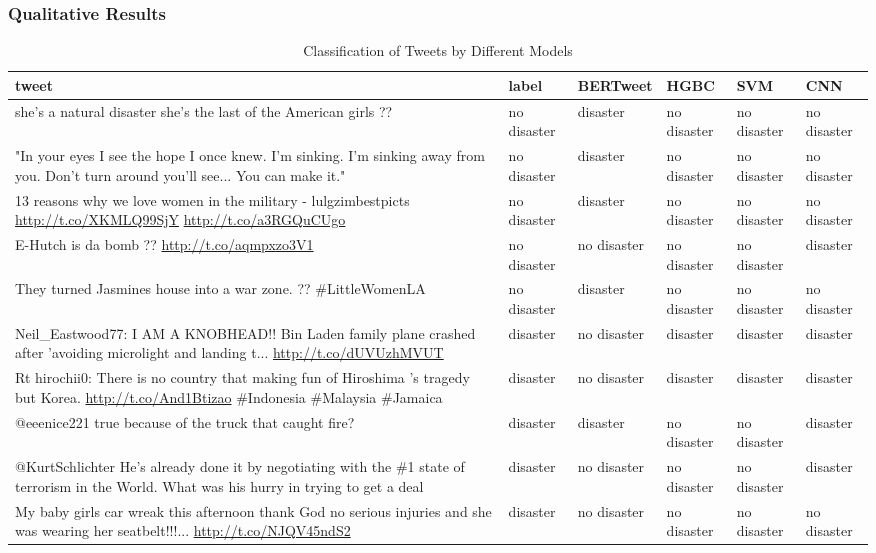 \documentclass[10pt,table]{article}
\begin{document}
\subsubsection{Qualitative Results}
\begin{table}[h]
    \centering
    \begin{tabular}{|p{6cm}|l|l|l|l|l|}
    \hline
    \textbf{tweet} & \textbf{label} & \textbf{BERTweet} & \textbf{HGBC} & \textbf{SVM} & \textbf{CNN} \\ \hline
    she's a natural disaster she's the last of the American girls ?? & no disaster & disaster & no disaster & no disaster & no disaster \\ \hline
    "In your eyes I see the hope I once knew. I'm sinking. I'm sinking away from you. Don't turn around you'll see... You can make it." & no disaster & disaster & no disaster & no disaster & no disaster \\ \hline
    13 reasons why we love women in the military - lulgzimbestpicts \url{http://t.co/XKMLQ99SjY} \url{http://t.co/a3RGQuCUgo} & no disaster & disaster & no disaster & no disaster & no disaster \\ \hline
    E-Hutch is da bomb ?? \url{http://t.co/aqmpxzo3V1} & no disaster & no disaster & no disaster & no disaster & disaster \\ \hline
    They turned Jasmines house into a war zone. ?? \#LittleWomenLA & no disaster & disaster & no disaster & no disaster & no disaster \\ \hline
    Neil\_Eastwood77: I AM A KNOBHEAD!! Bin Laden family plane crashed after 'avoiding microlight and landing t... \url{http://t.co/dUVUzhMVUT} & disaster & no disaster & disaster & disaster & disaster \\ \hline
    Rt hirochii0: There is no country that making fun of Hiroshima 's tragedy but Korea. \url{http://t.co/And1Btizao} \#Indonesia \#Malaysia \#Jamaica & disaster & no disaster & disaster & disaster & disaster \\ \hline
    @eeenice221 true because of the truck that caught fire? & disaster & disaster & no disaster & no disaster & disaster \\ \hline
    @KurtSchlichter He's already done it by negotiating with the \#1 state of terrorism in the World. What was his hurry in trying to get a deal & disaster & no disaster & no disaster & no disaster & disaster \\ \hline
    My baby girls car wreak this afternoon thank God no serious injuries and she was wearing her seatbelt!!!... \url{http://t.co/NJQV45ndS2} & disaster & no disaster & no disaster & no disaster & no disaster \\ \hline
    \end{tabular}
    \caption{Classification of Tweets by Different Models}
    \label{tab:tweets_classification}
\end{table}
\end{document}

